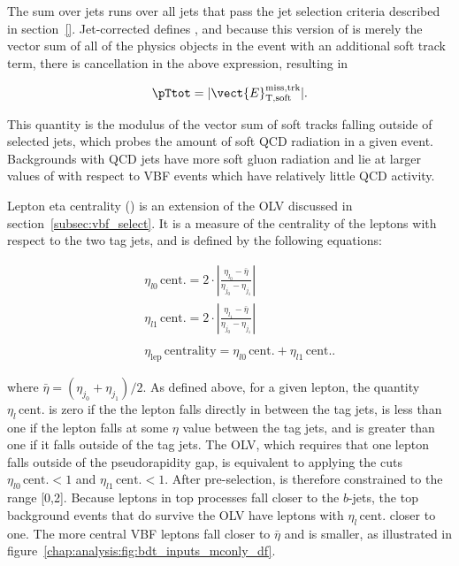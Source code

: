 \noindent
The sum over jets runs over all jets that pass the jet selection
criteria described in section~\ref{}. Jet-corrected \etmiss
defines \vmet, and because this version of \etmiss is merely the
vector sum of all of the physics objects in the event with an
additional soft track term, there is cancellation in the above
expression, resulting in

\begin{equation}
\begin{aligned}
\label{chap:analysis:equation:pttot_2}
\pTtot = |\vect{E}_{\mathrm{T,soft}}^{\mathrm{miss,trk}}|.
\end{aligned}
\end{equation}

\noindent
This quantity is the modulus of the vector sum of soft tracks
falling outside of selected jets, which probes the amount of soft QCD
radiation in a given event. Backgrounds with QCD jets have more soft
gluon radiation and lie at larger values of \pTtot with respect to VBF
events which have relatively little QCD activity. 

Lepton eta centrality (\lepEtaCent) is an extension of the OLV
discussed in section~\ref{subsec:vbf_select}. It is a measure of the
centrality of the leptons with respect to the two tag jets, and is
defined by the following equations:

\begin{eqnarray}
&& \eta_{l0} \, \textrm{cent.} = 2 \cdot
|\frac{\eta_{l_0}-\bar{\eta}}{\eta_{j_0}-\eta_{j_1}}|  \nonumber\\
&& \eta_{l1} \, \textrm{cent.} = 2 \cdot
|\frac{\eta_{l_1}-\bar{\eta}}{\eta_{j_0}-\eta_{j_1}}|  \nonumber\\
&&\nonumber \\
&& \eta_{\mathrm{lep}} \, \textrm{centrality}
= \eta_{l0} \, \textrm{cent.} + \eta_{l1} \, \textrm{cent.}.
\label{eqn:contOLV_def}
\end{eqnarray}

\noindent
where $\bar{\eta} = (\eta_{j_0}+\eta_{j_1})/2$. As defined above, for
a given lepton, the quantity $\eta_{l} \, \textrm{cent.}$ is zero if
the the lepton falls directly in between the tag jets, is less than
one if the lepton falls at some $\eta$ value between the tag jets, and is greater than one if
it falls outside of the tag jets. The OLV, which requires that one
lepton falls outside of the pseudorapidity gap, is equivalent to
applying the cuts $\eta_{l0} \, \textrm{cent.} < 1$ and 
$\eta_{l1} \, \textrm{cent.} < 1$. After pre-selection, \lepEtaCent is therefore constrained to the range [0,2]. Because
leptons in top processes fall closer to the $b$-jets, the top background
events that do survive the OLV have leptons with $\eta_{l} \, \textrm{cent.}$ closer to
one. The more central VBF leptons fall closer to $\bar{\eta}$
and \lepEtaCent is smaller, as illustrated in figure~\ref{chap:analysis:fig:bdt_inputs_mconly_df}.

